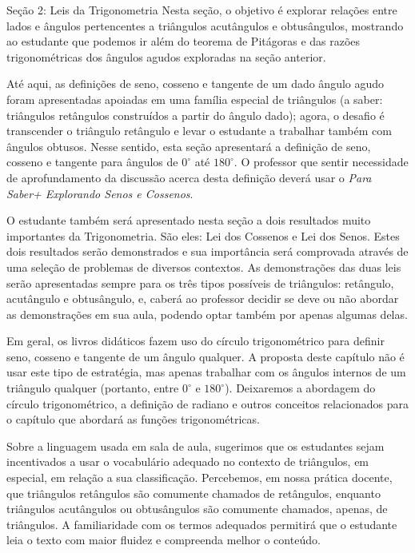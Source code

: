 \begin{paginatexto}{Seção 2: Leis da Trigonometria}
Nesta seção, o objetivo é explorar relações entre lados e ângulos pertencentes a triângulos acutângulos e obtusângulos, mostrando ao estudante que podemos ir além do teorema de Pitágoras e das razões trigonométricas dos ângulos agudos exploradas na seção anterior.

Até aqui, as definições de seno, cosseno e tangente de um dado ângulo agudo foram apresentadas apoiadas em uma família especial de triângulos (a saber: triângulos retângulos construídos a partir do ângulo dado); agora, o desafio é transcender o triângulo retângulo e levar o estudante a trabalhar também com ângulos obtusos. 
%
Nesse sentido, esta seção apresentará a definição de seno, cosseno e tangente para ângulos de $0^\circ$ até $180^\circ$. 
%
O professor que sentir necessidade de aprofundamento da discussão acerca desta definição deverá usar o \textit{Para Saber+ Explorando Senos e Cossenos}.

O estudante também será apresentado nesta seção a dois resultados muito importantes da Trigonometria. 
%
São eles: Lei dos Cossenos e Lei dos Senos.
%
Estes dois resultados serão demonstrados e sua importância será comprovada através de uma seleção de problemas de diversos contextos.
%
As demonstrações das duas leis serão apresentadas sempre para os três tipos possíveis de triângulos: retângulo, acutângulo e obtusângulo, e, caberá ao professor decidir se deve ou não abordar as demonstrações em sua aula, podendo optar também por apenas algumas delas.

Em geral, os livros didáticos fazem uso do círculo trigonométrico para definir seno, cosseno e tangente de um ângulo qualquer.
%
A proposta deste capítulo não é usar este tipo de estratégia, mas apenas trabalhar com os ângulos internos de um triângulo qualquer (portanto, entre $0^\circ$ e $180^\circ$).
%
Deixaremos a abordagem do círculo trigonométrico, a definição de radiano e outros conceitos relacionados para o capítulo que abordará as funções trigonométricas.

Sobre a linguagem usada em sala de aula, sugerimos que os estudantes sejam incentivados a usar o vocabulário adequado no contexto de triângulos, em especial, em relação a sua classificação. 
%
Percebemos, em nossa prática docente, que triângulos retângulos são comumente chamados de retângulos, enquanto triângulos acutângulos ou obtusângulos são comumente chamados, apenas, de triângulos.
%
A familiaridade com os termos adequados permitirá que o estudante leia o texto com maior fluidez e compreenda melhor o conteúdo.


\end{paginatexto}
